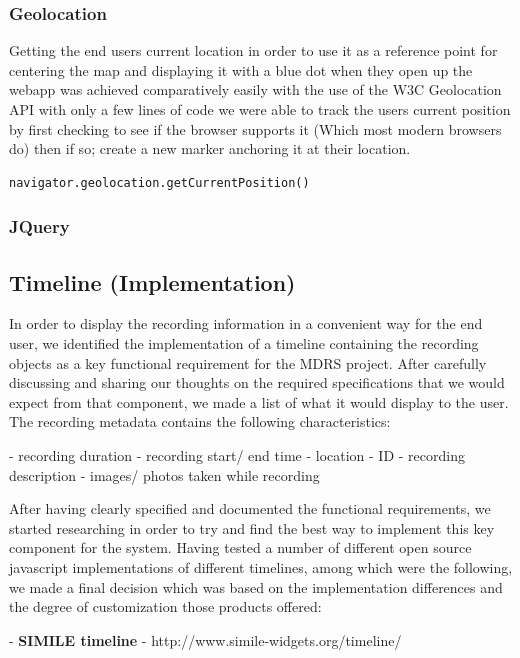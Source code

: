 \documentclass{l3proj}
\begin{document}
\subsubsection{Geolocation}

Getting the end users current location in order to use it as a
reference point for centering the map and displaying it with a blue
dot when they open up the webapp was achieved comparatively easily
with the use of the W3C Geolocation API with only a few lines of code
we were able to track the users current position by first checking to
see if the browser supports it (Which most modern browsers do) then if
so; create a new marker anchoring it at their location.
\begin{verbatim}
navigator.geolocation.getCurrentPosition()
\end{verbatim}

\subsubsection{JQuery} 

\subsection{Timeline (Implementation)}

In order to display the recording information in a convenient way for the end user, we identified the implementation of a timeline containing the recording objects as a key functional requirement for the MDRS project. After carefully discussing and sharing our thoughts on the required specifications that we would expect from that component, we made a list of what it would display to the user. The recording metadata contains the following characteristics:

- recording duration
- recording start/ end time
- location
- ID
- recording description
- images/ photos taken while recording

After having clearly specified and documented the functional requirements, we started researching in order to try and find the best way to implement this key component for the system. Having tested a number of different open source javascript implementations of different timelines, among which were the following, we made a final decision which was based on the implementation differences and the degree of customization those products offered:


- \textbf{SIMILE timeline} - http://www.simile-widgets.org/timeline/
\end{document}
